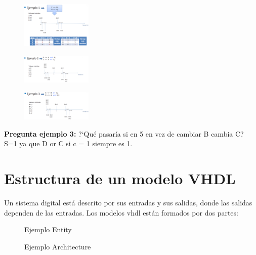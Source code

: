 \begin{multicols}{3}
	\begin{figure}[H]
		\centering
		\includegraphics[width=0.3\textwidth]{images/Tema_1/VHDL_Ejemplo_1.PNG}
	\end{figure}
	\vfill
	\begin{figure}[H]
		\centering
		\includegraphics[width=0.3\textwidth]{images/Tema_1/VHDL_Ejemplo_2.PNG}
	\end{figure}
	\vfill
	\begin{figure}[H]
		\centering
		\includegraphics[width=0.3\textwidth]{images/Tema_1/VHDL_Ejemplo_3.PNG}
	\end{figure}
\end{multicols}


\textbf{Pregunta ejemplo 3: }?`Qué pasaría si en 5 en vez de cambiar B cambia C? S=1 ya que D or C si c = 1 siempre es 1.


\section{Estructura de un modelo VHDL}
Un sistema digital está descrito por sus entradas y sus salidas, donde las salidas dependen de las entradas.
Los modelos \gls{vhdl} están formados por dos partes:
\begin{multicols}{2}
	\begin{figure}[H]
		\centering
		
		\caption{Ejemplo Entity}
	\end{figure}
	\vfill
	\begin{figure}[H]
		\centering
		
		\caption{Ejemplo Architecture}
	\end{figure}
\end{multicols}

